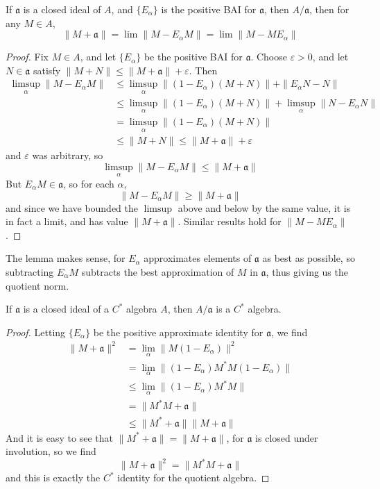 \begin{lemma}
    If $\mathfrak{a}$ is a closed ideal of $A$, and $\{ E_\alpha \}$ is the positive BAI for $\mathfrak{a}$, then $A/\mathfrak{a}$, then for any $M \in A$,
    \[ \| M + \mathfrak{a} \| = \lim \| M - E_\alpha M \| = \lim \| M - M E_\alpha \| \]
\end{lemma}
\begin{proof}
    Fix $M \in A$, and let $\{ E_\alpha \}$ be the positive BAI for $\mathfrak{a}$. Choose $\varepsilon > 0$, and let $N \in \mathfrak{a}$ satisfy $\| M + N \| \leq \| M + \mathfrak{a} \| + \varepsilon$. Then
    \begin{align*}
        \limsup_\alpha \| M - E_\alpha M \| &\leq \limsup_\alpha \| (1 - E_\alpha)(M + N) \| + \| E_\alpha N - N \|\\
        &\leq \limsup_\alpha \| (1 - E_\alpha)(M + N) \| + \limsup_\alpha \| N - E_\alpha N \|\\
        &= \limsup_\alpha \| (1 - E_\alpha) (M + N) \|\\
        &\leq \| M + N \| \leq \| M + \mathfrak{a} \| + \varepsilon
    \end{align*}
    and $\varepsilon$ was arbitrary, so
    \[ \limsup_\alpha \| M - E_\alpha M \| \leq \| M + \mathfrak{a} \| \]
    But $E_\alpha M \in \mathfrak{a}$, so for each $\alpha$,
    \[ \| M - E_\alpha M \| \geq \| M + \mathfrak{a} \| \]
    and since we have bounded the $\limsup$ above and below by the same value, it is in fact a limit, and has value $\| M + \mathfrak{a} \|$. Similar results hold for $\| M - M E_\alpha \|$.
\end{proof}

The lemma makes sense, for $E_\alpha$ approximates elements of $\mathfrak{a}$ as best as possible, so subtracting $E_\alpha M$ subtracts the best approximation of $M$ in $\mathfrak{a}$, thus giving us the quotient norm.

\begin{theorem}
    If $\mathfrak{a}$ is a closed ideal of a $C^*$ algebra $A$, then $A/\mathfrak{a}$ is a $C^*$ algebra.
\end{theorem}
\begin{proof}
    Letting $\{ E_\alpha \}$ be the positive approximate identity for $\mathfrak{a}$, we find
    \begin{align*}
        \| M + \mathfrak{a} \|^2 &= \lim_\alpha \| M (1 - E_\alpha) \|^2\\
        &= \lim_\alpha \| (1 - E_\alpha) M^*M (1 - E_\alpha) \|\\
        &\leq \lim_\alpha \| (1 - E_\alpha) M^*M \|\\
        &= \| M^*M + \mathfrak{a} \|\\
        &\leq \| M^* + \mathfrak{a} \| \| M + \mathfrak{a} \|
    \end{align*}
    And it is easy to see that $\| M^* + \mathfrak{a} \| = \| M + \mathfrak{a} \|$, for $\mathfrak{a}$ is closed under involution, so we find
    \[ \| M + \mathfrak{a} \|^2 = \| M^*M + \mathfrak{a} \| \]
    and this is exactly the $C^*$ identity for the quotient algebra.
\end{proof}


